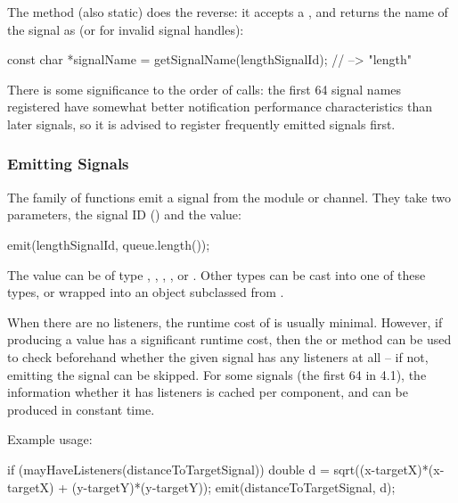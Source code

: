 The  method (also static) does the reverse:
it accepts a , and returns the name of the signal as
 (or  for invalid signal handles):

\begin{cpp}
const char *signalName = getSignalName(lengthSignalId); // --> "length"
\end{cpp}

\begin{note}
  There is some significance to the order of  calls: the
  first 64 signal names registered have somewhat better notification
  performance characteristics than later signals, so it is advised to
  register frequently emitted signals first.
\end{note}

\subsubsection{Emitting Signals}

The  family of functions emit a signal from the module or
channel. They take two parameters, the signal ID () and
the value:

\begin{cpp}
emit(lengthSignalId, queue.length());
\end{cpp}

The value can be of type , , ,
, or . Other types can be cast into
one of these types, or wrapped into an object subclassed from .

When there are no listeners, the runtime cost of  is usually minimal.
However, if producing a value has a significant runtime cost, then the
 or  method can be used
to check beforehand whether the given signal has any listeners at all --
if not, emitting the signal can be skipped. For some signals (the first 64
in {\opp} 4.1), the information whether it has listeners is cached per
component, and can be produced in constant time.

Example usage:

\begin{cpp}
if (mayHaveListeners(distanceToTargetSignal))
{
    double d = sqrt((x-targetX)*(x-targetX) + (y-targetY)*(y-targetY));
    emit(distanceToTargetSignal, d);
}
\end{cpp}


